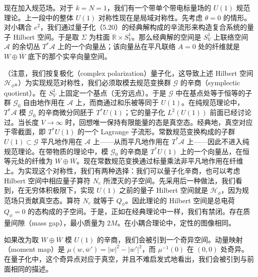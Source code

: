 现在加入规范场。对于 $k=N=1$，我们有一个带单个带电标量场的 $U(1)$ 规范理论。上一段中的整体 $U(1)$ 对称性现在是局域对称性。先考虑 $\theta=0$ 的情形。对小耦合 $e^2$，我们通过量子化（5.20）的经典解构成的辛流形来构造复合系统的量子 Hilbert 空间。于是取 $\Sigma$ 为柱面 $\mathbb{R}\times S^1_V$。那么经典解的空间是 $S^1_V$ 上联络空间 $\mathcal{A}$ 的余切丛 $T^*\mathcal{A}$ 上的一个向量丛；该向量丛在平凡联络 $A=0$ 处的纤维就是 $W\oplus\overline{W}$ 底下的那个实辛向量空间。

（注意，我们按复极化（complex polarization）量子化，这导致上述 Hilbert 空间 $\mathcal{H}_\phi$。）为实现规范对称性，我们必须取模去规范变换群 $\mathcal{G}$ 的辛商（symplectic quotient）。在 $S^1_V$ 上固定一个基点（无穷远点）。于是 $\mathcal{G}$ 中在基点处等于恒等的子群 $\mathcal{G}_0$ 自由地作用在 $\mathcal{A}$ 上，而商通过和乐被等同于 $U(1)$。在纯规范理论中，$T^*\mathcal{A}$ 模 $\mathcal{G}_0$ 的辛商微分同胚于 $T^*U(1)$；它的量子化 $L^2(U(1))$ 前面已经讨论过。当长度 $V\to\infty$ 时，回想唯一保持有限能量的态是真空态。经典地，真空对应于零截面，即 $T^*U(1)$ 的一个 Lagrange 子流形。常数规范变换构成的子群 $U(1)\subset\mathcal{G}$ 平凡地作用在 $\mathcal{A}$ 上——从而平凡地作用在 $T^*\mathcal{A}$ 上——因此不进入纯规范理论。在带物质的理论中，模 $\mathcal{G}_0$ 的辛商是 $T^*U(1)$ 上的一个向量丛，在恒等元处的纤维为 $W\oplus\overline{W}$。现在常数规范变换通过标量乘法非平凡地作用在纤维上。为实现这个对称性，我们有两种选择：我们可以量子化辛商，也可以考虑 Hilbert 空间中相应量子算符 $N_e$ 所湮灭的子空间。先采用后一种做法，我们看到，在无穷体积极限下，实现 $U(1)$ 之前的量子 Hilbert 空间就是 $\mathcal{H}_\phi$，因为规范场只贡献真空态。算符 $N_e$ 就等于 $Q_\phi$。因此理论的 Hilbert 空间是总电荷 $Q_\phi=0$ 的态构成的子空间。于是，正如在经典理论中一样，我们有禁闭。存在质量间隙（mass gap），最小质量为 $2M$。在小耦合理论中，定性的图像相同。

如果改为取 $W\oplus\overline{W}$ 模 $U(1)$ 的辛商，我们会被引到一个奇异空间。动量映射（moment map）是 $\mu(w,\overline{w}')=|w|^2-|\overline{w}'|^2$，而 $\mu^{-1}(0)$ 在 $(0,0)$ 处奇异。在量子化中，这个奇异点对应于真空，并且不难启发式地看出，我们会被引到与前面相同的描述。


